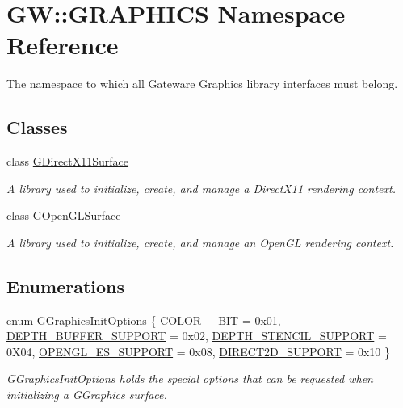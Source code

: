 \hypertarget{namespaceGW_1_1GRAPHICS}{}\section{GW\+::G\+R\+A\+P\+H\+I\+CS Namespace Reference}
\label{namespaceGW_1_1GRAPHICS}


The namespace to which all Gateware Graphics library interfaces must belong.  


\subsection*{Classes}
\begin{DoxyCompactItemize}
\item 
class \mbox{\hyperlink{classGW_1_1GRAPHICS_1_1GDirectX11Surface}{G\+Direct\+X11\+Surface}}
\begin{DoxyCompactList}\small\item\em A library used to initialize, create, and manage a Direct\+X11 rendering context. \end{DoxyCompactList}\item 
class \mbox{\hyperlink{classGW_1_1GRAPHICS_1_1GOpenGLSurface}{G\+Open\+G\+L\+Surface}}
\begin{DoxyCompactList}\small\item\em A library used to initialize, create, and manage an Open\+GL rendering context. \end{DoxyCompactList}\end{DoxyCompactItemize}
\subsection*{Enumerations}
\begin{DoxyCompactItemize}
\item 
enum \mbox{\hyperlink{namespaceGW_1_1GRAPHICS_afbd9d6f65375744d2338ce060d42c85b}{G\+Graphics\+Init\+Options}} \{ \newline
\mbox{\hyperlink{namespaceGW_1_1GRAPHICS_afbd9d6f65375744d2338ce060d42c85ba955a3a5f0ed41c744182916c5bf68e15}{C\+O\+L\+O\+R\+\_\+\_\+\+B\+IT}} = 0x01, 
\mbox{\hyperlink{namespaceGW_1_1GRAPHICS_afbd9d6f65375744d2338ce060d42c85ba1bade4c85d55718f2b27dcc38c332a3a}{D\+E\+P\+T\+H\+\_\+\+B\+U\+F\+F\+E\+R\+\_\+\+S\+U\+P\+P\+O\+RT}} = 0x02, 
\mbox{\hyperlink{namespaceGW_1_1GRAPHICS_afbd9d6f65375744d2338ce060d42c85bacac34b90e4af450189dd5e824cbbd452}{D\+E\+P\+T\+H\+\_\+\+S\+T\+E\+N\+C\+I\+L\+\_\+\+S\+U\+P\+P\+O\+RT}} = 0X04, 
\mbox{\hyperlink{namespaceGW_1_1GRAPHICS_afbd9d6f65375744d2338ce060d42c85bae59cf357d12d379a206c08211dedc57f}{O\+P\+E\+N\+G\+L\+\_\+\+E\+S\+\_\+\+S\+U\+P\+P\+O\+RT}} = 0x08, 
\newline
\mbox{\hyperlink{namespaceGW_1_1GRAPHICS_afbd9d6f65375744d2338ce060d42c85ba9c847baaca0bdcb897b2332cc8d3b5dc}{D\+I\+R\+E\+C\+T2\+D\+\_\+\+S\+U\+P\+P\+O\+RT}} = 0x10
 \}
\begin{DoxyCompactList}\small\item\em G\+Graphics\+Init\+Options holds the special options that can be requested when initializing a G\+Graphics surface. \end{DoxyCompactList}\end{DoxyCompactItemize}
